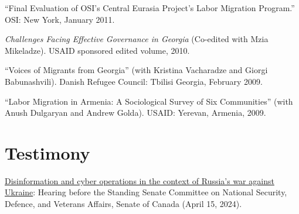 \documentclass[margin,line]{res}
\begin{document}
``Final Evaluation of OSI's Central Eurasia Project's Labor Migration Program.'' OSI: New York, January 2011.

\emph{Challenges Facing Effective Governance in Georgia} (Co-edited with Mzia Mikeladze). USAID sponsored edited volume, 2010.

``Voices of Migrants from Georgia''  (with Kristina Vacharadze and Giorgi Babunashvili). Danish Refugee Council: Tbilisi Georgia, February 2009.

``Labor Migration in Armenia: A Sociological Survey of Six Communities'' (with Anush Dulgaryan and Andrew Golda).  USAID: Yerevan, Armenia, 2009.

\section{\sc Testimony}
\href{https://senparlvu.parl.gc.ca/Harmony/en/PowerBrowser/PowerBrowserV2?fk=635443&globalStreamId=3}{Disinformation and cyber operations in the context of Russia's war against Ukraine}: Hearing before the Standing Senate Committee on National Security, Defence, and Veterans Affairs, Senate of Canada (April 15, 2024).
\end{document}
